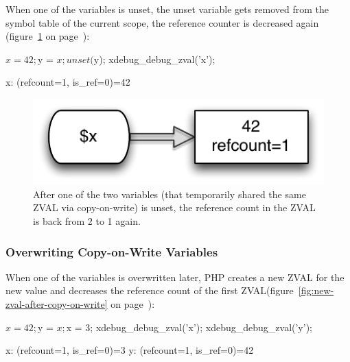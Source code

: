 When one of the variables is unset, the unset variable gets removed from the symbol table of the current scope, the reference counter is decreased again (figure~\ref{fig:reference-count-decreased} on page~\pageref{fig:reference-count-decreased}):

\begin{phpcode}
$x = 42;
$y = $x;
unset($y);
xdebug_debug_zval('x');
\end{phpcode}

\begin{textcode}
x: (refcount=1, is_ref=0)=42
\end{textcode}

\begin{figure}[!h]
  \begin{center}
    \includegraphics[scale=0.8]{images/x_42}
    \caption{After one of the two variables (that temporarily shared the same ZVAL via copy-on-write) is unset, the reference count in the ZVAL is back from 2 to 1 again.}
    \label{fig:reference-count-decreased}
  \end{center}
\end{figure}


\subsubsection{Overwriting Copy-on-Write Variables}
\label{sec:overwriting}

When one of the variables is overwritten later, PHP creates a new ZVAL for the new value and decreases the reference count of the first ZVAL(figure~\ref{fig:new-zval-after-copy-on-write} on page~\pageref{fig:new-zval-after-copy-on-write}):

\begin{phpcode}
$x = 42;
$y = $x;
$x = 3;
xdebug_debug_zval('x');
xdebug_debug_zval('y');
\end{phpcode}

\begin{textcode}
x: (refcount=1, is_ref=0)=3
y: (refcount=1, is_ref=0)=42
\end{textcode}

